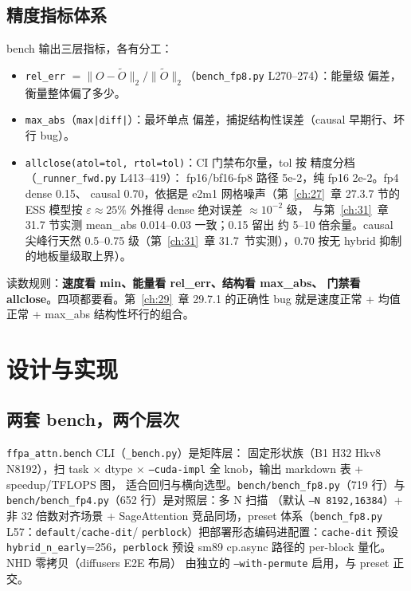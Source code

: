 \subsection{精度指标体系}

bench 输出三层指标，各有分工：
\begin{itemize}[itemsep=0pt,topsep=2pt]
  \item \texttt{rel\_err} $=\lVert O-\tilde O\rVert_2/\lVert
        \tilde O\rVert_2$（\texttt{bench\_fp8.py} L270--274）：能量级
        偏差，衡量整体偏了多少。
  \item \texttt{max\_abs}（\texttt{max|diff|}）：最坏单点
        偏差，捕捉结构性误差（causal 早期行、坏行 bug）。

  \item \texttt{allclose(atol=tol, rtol=tol)}：CI 门禁布尔量，tol 按
        精度分档（\texttt{\_runner\_fwd.py} L413--419）：
        fp16/bf16-fp8 路径 5e-2，纯 fp16 2e-2。fp4 dense 0.15、
        causal 0.70，依据是 e2m1 网格噪声（第~\ref{ch:27}~章 27.3.7 节的
        ESS 模型按 $\varepsilon\approx25\%$ 外推得 dense 绝对误差 $\approx10^{-2}$ 级，
        与第~\ref{ch:31}~章 31.7 节实测 mean\_abs 0.014--0.03 一致；0.15 留出
        约 5--10 倍余量。causal 尖峰行天然 0.5--0.75 级（第~\ref{ch:31}~章
        31.7~节实测），0.70 按无 hybrid 抑制的地板量级取上界）。
\end{itemize}

读数规则：\textbf{速度看 min、能量看 rel\_err、结构看 max\_abs、
门禁看 allclose}。四项都要看。第~\ref{ch:29}~章 29.7.1 的正确性
bug 就是速度正常 + 均值正常 + max\_abs 结构性坏行的组合。

\section{设计与实现}

\subsection{两套 bench，两个层次}

\texttt{ffpa\_attn.bench} CLI（\texttt{\_bench.py}）是矩阵层：
固定形状族（B1 H32 Hkv8 N8192），扫 task $\times$ dtype $\times$
\texttt{--cuda-impl} 全 knob，输出 markdown 表 + speedup/TFLOPS 图，
适合回归与横向选型。\texttt{bench/bench\_fp8.py}（719 行）与
\texttt{bench/bench\_fp4.py}（652 行）是对照层：多 N 扫描
（默认 \texttt{--N 8192,16384}）+ 非 32 倍数对齐场景 + SageAttention
竞品同场，preset
体系（\texttt{bench\_fp8.py} L57：\texttt{default}/\texttt{cache-dit}/
\texttt{perblock}）把部署形态编码进配置：\texttt{cache-dit} 预设
\texttt{hybrid\_n\_early}=256，\texttt{perblock} 预设
sm89 cp.async 路径的 per-block 量化。NHD 零拷贝（diffusers E2E 布局）
由独立的 \texttt{--with-permute} 启用，与 preset 正交。


